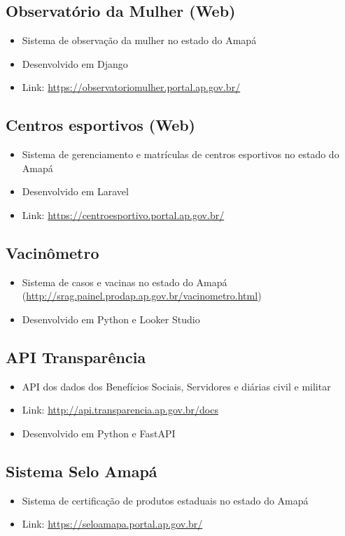 \documentclass{article}
\begin{document}
\subsection{Observatório da Mulher (Web)}
\begin{itemize}
  \item Sistema de observação da mulher no estado do Amapá
  \item Desenvolvido em Django
  \item Link: \url{https://observatoriomulher.portal.ap.gov.br/}
\end{itemize}

\subsection{Centros esportivos (Web)}
\begin{itemize}
  \item Sistema de gerenciamento e matrículas de centros esportivos no estado do Amapá
  \item Desenvolvido em Laravel
  \item Link: \url{https://centroesportivo.portal.ap.gov.br/}
\end{itemize}

\subsection{Vacinômetro}
\begin{itemize}
  \item Sistema de casos e vacinas no estado do Amapá (\url{http://srag.painel.prodap.ap.gov.br/vacinometro.html})
  \item Desenvolvido em Python e Looker Studio
\end{itemize}

\subsection{API Transparência}
\begin{itemize}
  \item API dos dados dos Benefícios Sociais, Servidores e diárias civil e militar
  \item Link: \url{http://api.transparencia.ap.gov.br/docs}
  \item Desenvolvido em Python e FastAPI
\end{itemize}

\subsection{Sistema Selo Amapá}
\begin{itemize}
  \item Sistema de certificação de produtos estaduais no estado do Amapá
  \item Link: \url{https://seloamapa.portal.ap.gov.br/}
\end{itemize}
\end{document}
